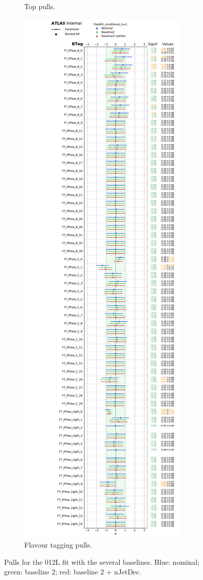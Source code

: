 \begin{figure}[h!]
\begin{subfigure}[b]{0.49\textwidth}
\caption{Top pulls.} 
\label{fig:pullsTop}
\end{subfigure}
 \hfill
\begin{subfigure}[b]{0.49\textwidth}
\includegraphics[scale=0.36]{Images/VH/clean_pull/NP_BTag.pdf}
\caption{Flavour tagging pulls.} 
\label{fig:pullsFTAG}
\end{subfigure}
\caption{Pulls for the 012L fit with the several baselines. Blue: nominal; green: baseline 2; red: baseline 2 + nJetDec.}
\label{fig:pulls}
\end{figure} 

